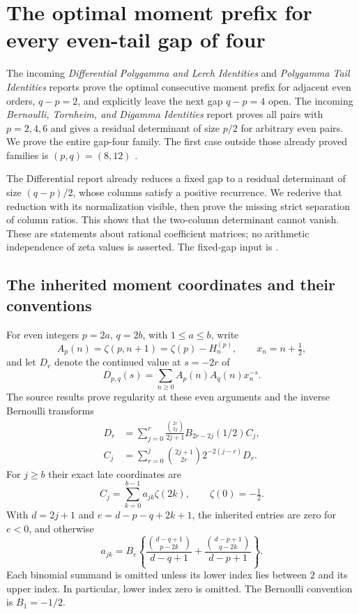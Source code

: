 
\section{The optimal moment prefix for every even-tail gap of four}
\label{gap:section}

The incoming \emph{Differential Polygamma and Lerch Identities} and
\emph{Polygamma Tail Identities} reports prove the optimal consecutive
moment prefix for adjacent even orders, $q-p=2$, and explicitly leave
the next gap $q-p=4$ open. The incoming
\emph{Bernoulli, Tornheim, and Digamma Identities} report proves all
pairs with $p=2,4,6$ and gives a residual determinant of size $p/2$
for arbitrary even pairs. We prove the entire gap-four family. The
first case outside those already proved families is $(p,q)=(8,12)$
\cite{DPL,PTI,BTD}.

The Differential report already reduces a fixed gap to a residual
determinant of size $(q-p)/2$, whose columns satisfy a positive
recurrence. We rederive that reduction with its normalization visible,
then prove the missing strict separation of column ratios. This shows
that the two-column determinant cannot vanish. These are statements
about rational coefficient matrices; no arithmetic independence of
zeta values is asserted. The fixed-gap input is
\cite[\texttt{ar:gap-det}, \texttt{ar:gap-factor}]{DPL}.

\subsection{The inherited moment coordinates and their conventions}

For even integers $p=2a$, $q=2b$, with $1\le a\le b$, write
\[
 A_p(n)=\zeta(p,n+1)=\zeta(p)-H_n^{(p)},\qquad x_n=n+\tfrac12,
\]
and let $D_r$ denote the continued value at $s=-2r$ of
\[
 D_{p,q}(s)=\sum_{n\ge0}A_p(n)A_q(n)x_n^{-s}.
\]
The source results prove regularity at these even arguments and the
inverse Bernoulli transforms
\begin{align}
 D_r&=\sum_{j=0}^r\frac{\binom{2r}{2j}}{2j+1}
 B_{2r-2j}(1/2)C_j,\label{gap:forward}\\
 C_j&=\sum_{r=0}^j\binom{2j+1}{2r}2^{-2(j-r)}D_r.
 \label{gap:inverse}
\end{align}
For $j\ge b$ their exact late coordinates are
\begin{equation}\label{gap:late-coordinates}
 C_j=\sum_{k=0}^{b-1}a_{jk}\zeta(2k),\qquad \zeta(0)=-\tfrac12.
\end{equation}
With $d=2j+1$ and $e=d-p-q+2k+1$, the inherited entries are zero
for $e<0$, and otherwise
\begin{equation}\label{gap:source-entry}
 a_{jk}=B_e\left\{
 \frac{\binom{d-q+1}{p-2k}}{d-q+1}
 +\frac{\binom{d-p+1}{q-2k}}{d-p+1}\right\}.
\end{equation}
Each binomial summand is omitted unless its lower index lies between
$2$ and its upper index. In particular, lower index zero is omitted.
The Bernoulli convention is $B_1=-1/2$.


